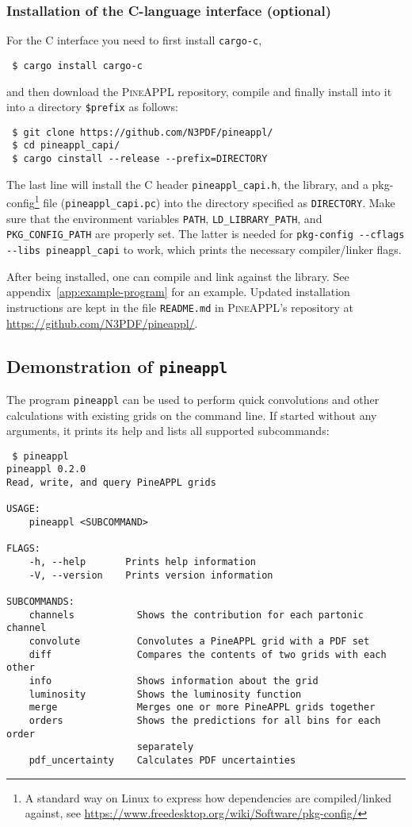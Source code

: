 \subsubsection*{Installation of the C-language interface (optional)}

For the C interface you need to first install \texttt{cargo-c},
\begin{verbatim}
 $ cargo install cargo-c
\end{verbatim}
and then download the \textsc{PineAPPL} repository, compile and finally install into it into a directory \texttt{\$prefix} as follows:
\begin{verbatim}
 $ git clone https://github.com/N3PDF/pineappl/
 $ cd pineappl_capi/
 $ cargo cinstall --release --prefix=DIRECTORY
\end{verbatim}
The last line will install the C header \texttt{pineappl\_capi.h}, the library, and a pkg-config\footnote{A standard way on Linux to express how dependencies are compiled/linked against, see \url{https://www.freedesktop.org/wiki/Software/pkg-config/}} file (\texttt{pineappl\_capi.pc}) into the directory specified as \texttt{DIRECTORY}.
Make sure that the environment variables \texttt{PATH}, \texttt{LD\_LIBRARY\_PATH}, and \texttt{PKG\_CONFIG\_PATH} are properly set.
The latter is needed for \texttt{pkg-config -{}-cflags -{}-libs pineappl\_capi} to work, which prints the necessary compiler/linker flags.

After being installed, one can compile and link against the library.
See appendix~\ref{app:example-program} for an example.
Updated installation instructions are kept in the file \texttt{README.md} in \textsc{PineAPPL}'s repository at \url{https://github.com/N3PDF/pineappl/}.

\subsection{Demonstration of \texorpdfstring{\texttt{pineappl}}{pineappl}}
\label{app:pineappl-demo}

The program \texttt{pineappl} can be used to perform quick convolutions and other calculations with existing grids on the command line.
If started without any arguments, it prints its help and lists all supported subcommands:
\begin{verbatim}
 $ pineappl
pineappl 0.2.0
Read, write, and query PineAPPL grids

USAGE:
    pineappl <SUBCOMMAND>

FLAGS:
    -h, --help       Prints help information
    -V, --version    Prints version information

SUBCOMMANDS:
    channels           Shows the contribution for each partonic channel
    convolute          Convolutes a PineAPPL grid with a PDF set
    diff               Compares the contents of two grids with each other
    info               Shows information about the grid
    luminosity         Shows the luminosity function
    merge              Merges one or more PineAPPL grids together
    orders             Shows the predictions for all bins for each order
                       separately
    pdf_uncertainty    Calculates PDF uncertainties
\end{verbatim}

